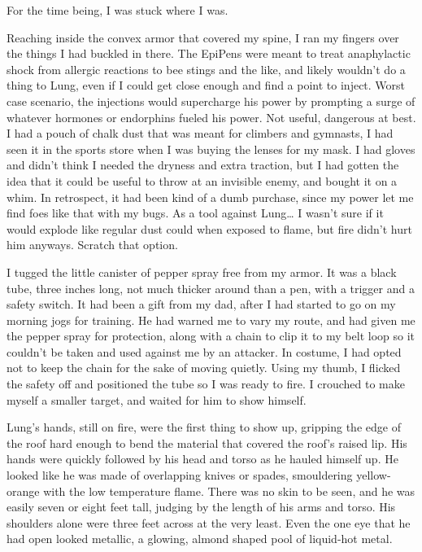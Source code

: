 For the time being, I was stuck where I was.

Reaching inside the convex armor that covered my spine, I ran my fingers over the things I had buckled in there. The EpiPens were meant to treat anaphylactic shock from allergic reactions to bee stings and the like, and likely wouldn't do a thing to Lung, even if I could get close enough and find a point to inject. Worst case scenario, the injections would supercharge his power by prompting a surge of whatever hormones or endorphins fueled his power. Not useful, dangerous at best. I had a pouch of chalk dust that was meant for climbers and gymnasts, I had seen it in the sports store when I was buying the lenses for my mask. I had gloves and didn't think I needed the dryness and extra traction, but I had gotten the idea that it could be useful to throw at an invisible enemy, and bought it on a whim. In retrospect, it had been kind of a dumb purchase, since my power let me find foes like that with my bugs. As a tool against Lung\ldots{} I wasn't sure if it would explode like regular dust could when exposed to flame, but fire didn't hurt him anyways. Scratch that option.

I tugged the little canister of pepper spray free from my armor. It was a black tube, three inches long, not much thicker around than a pen, with a trigger and a safety switch. It had been a gift from my dad, after I had started to go on my morning jogs for training. He had warned me to vary my route, and had given me the pepper spray for protection, along with a chain to clip it to my belt loop so it couldn't be taken and used against me by an attacker. In costume, I had opted not to keep the chain for the sake of moving quietly. Using my thumb, I flicked the safety off and positioned the tube so I was ready to fire. I crouched to make myself a smaller target, and waited for him to show himself.

Lung's hands, still on fire, were the first thing to show up, gripping the edge of the roof hard enough to bend the material that covered the roof's raised lip. His hands were quickly followed by his head and torso as he hauled himself up. He looked like he was made of overlapping knives or spades, smouldering yellow-orange with the low temperature flame. There was no skin to be seen, and he was easily seven or eight feet tall, judging by the length of his arms and torso. His shoulders alone were three feet across at the very least. Even the one eye that he had open looked metallic, a glowing, almond shaped pool of liquid-hot metal.


